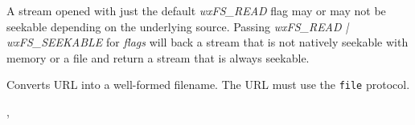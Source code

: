 A stream opened with just the default {\it wxFS\_READ} flag may
or may not be seekable depending on the underlying source.
Passing {\it wxFS\_READ | wxFS\_SEEKABLE} for {\it flags} will
back a stream that is not natively seekable with memory or a file
and return a stream that is always seekable.


\label{wxfilesystemurltofilename}


Converts URL into a well-formed filename. The URL must use the {\tt file} 
protocol.


, 

